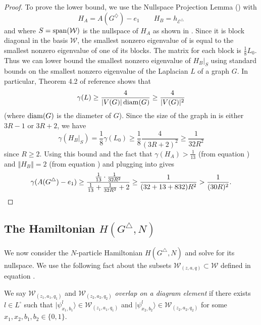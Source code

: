 \documentclass[../thesis-main/thesis-main]{subfiles}
\begin{document}
\begin{proof}
To prove the lower bound, we use the Nullspace Projection Lemma () with 
\[
H_{A}=A(G^{\diamondsuit})-e_{1}\qquad H_{B}=h_{\mathcal{E}^{\triangle}}
\]
and where $S=\operatorname{span}(\mathcal{W})$ is the nullspace of $H_{A}$ as shown in . Since it is block diagonal in the basis $\mathcal{W}$, the smallest nonzero eigenvalue of  is equal to the smallest nonzero eigenvalue of one of its blocks. The matrix for each block is $\frac{1}{8}L_{0}$. Thus we can lower bound the smallest nonzero eigenvalue of $H_B|_S$ using standard bounds on the smallest nonzero eigenvalue of the Laplacian $L$ of a graph $G$. In particular, Theorem 4.2 of reference \cite{Moh91} shows that 
\begin{equation*}
\gamma(L) \ge \frac{4}{|V(G)| \operatorname{diam}(G)} \ge \frac{4}{|V(G)|^2}
\end{equation*}
(where $\operatorname{diam}(G)$ is the diameter of $G$). Since the size of the graph in  is either $3R-1$ or $3R+2$, we have
\begin{equation*}
\gamma(H_{B}|_{S})=\frac{1}{8}\gamma(L_{0}) \geq \frac{1}{8}\frac{4}{\left(3R+2\right)^{2}}\geq\frac{1}{32R^{2}}
\end{equation*}
since $R\geq2$. Using this bound and the fact that $\gamma(H_{A})>\frac{1}{13}$ (from equation ) and $\left\Vert H_{B}\right\Vert =2$ (from equation ) and plugging into  gives
\[
\gamma(A(G^{\triangle})-e_{1})\geq\frac{\frac{1}{13}\cdot\frac{1}{32R^{2}}}{\frac{1}{13}+\frac{1}{32R^{2}}+2}\geq\frac{1}{(32+13+832)R^{2}}>\frac{1}{(30R)^{2}}. \qedhere
\]
\end{proof}

\subsection{The Hamiltonian $H(G^{\triangle},N)$}

We now consider the $N$-particle Hamiltonian $H(G^{\triangle},N)$ and solve for its nullspace. We use the following fact about the subsets $\mathcal{W}_{(z,a,q)}\subset\mathcal{W}$ defined in equation .

\begin{definition}
\label{defn:overlap_diagram_element}
We say $\mathcal{W}_{(z_{1},a_{1},q_{1})}$ and $\mathcal{W}_{(z_{2},a_{2},q_{2})}$ \emph{overlap on a diagram element} if there exists $l\in L^{\square}$ such that $|\psi_{x_{1},b_{1}}^{l}\rangle\in\mathcal{W}_{(z_{1},a_{1},q_{1})}$ and $|\psi_{x_{2},b_{2}}^{l}\rangle\in\mathcal{W}_{(z_{2},a_{2},q_{2})}$ for some $x_{1},x_{2},b_{1},b_{2}\in\{0,1\}$.
\end{definition}
\end{document}
